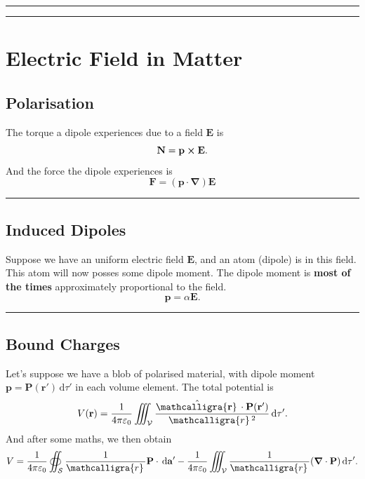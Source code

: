 \documentclass[12pt,english]{article}
\newcommand{\dmr}[1]{\, \mathrm{d}#1} %
\numberwithin{equation}{subsection}
\newcommand{\curly}[1]{\ensuremath{\mathcalligra{#1}\,}}
\let\oldhat\hat
\renewcommand{\vec}[1]{\mathbf{#1}}
\renewcommand{\hat}[1]{\oldhat{\mathbf{#1}}}
\begin{document}
\par\noindent\rule{\textwidth}{0.4pt}
\par\noindent\rule{\textwidth}{0.4pt}
\section{Electric Field in Matter}

\subsection{Polarisation}
The torque a dipole experiences due to a field $\vec{E}$ is 
\begin{equation}
    \vec{N} = \vec{p} \cross \vec{E}.
\end{equation}
And the force the dipole experiences is 
\begin{equation}
    \vec{F} = (\vec{p}\cdot\vec{\nabla})\vec{E}
\end{equation}
\par\noindent\rule{\textwidth}{0.4pt}

\subsection{Induced Dipoles}
Suppose we have an uniform electric field $\vec{E}$, and an atom (dipole) is in this field. This atom will now posses some dipole moment. The dipole moment is \textbf{most of the times} approximately proportional to the field.
\begin{equation}
    \vec{p} = \alpha \vec{E}.
\end{equation}
\par\noindent\rule{\textwidth}{0.4pt}
\subsection{Bound Charges}
Let's suppose we have a blob of polarised material, with dipole moment $\vec{p} = \vec{P}(\vec{r'})\dmr{\tau'}$ in each volume element. The total potential is 
\[
    V(\vec{r})= \frac{1}{4 \pi \varepsilon_0}\iiint_{\mathcal{V}}\frac{\hat{\curly{r}}\cdot \vec{P}(\vec{r'})}{\curly{r}^2}\dmr{\tau'}.
\]
And after some maths, we then obtain
\begin{equation}
    V = \frac{1}{4 \pi \varepsilon_0} \oiint_{\mathcal{S}} \frac{1}{\curly{r}} \vec{P}\cdot \dmr{\vec{a'}} - \frac{1}{4 \pi \varepsilon_0} \iiint_{\mathcal{V}} \frac{1}{\curly{r}} (\grad \cdot \vec{P}) \dmr{\tau'}.    
\end{equation}
\end{document}
